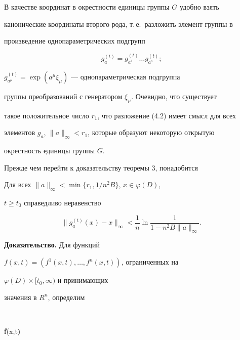 В качестве координат в окрестности единицы группы $G$ удобно взять 


канонические координаты второго рода, т.\,е.~разложить элемент группы в 


произведение однопараметрических подгрупп 


\begin{equation} 


g^{(t)}_a=g^{(t)}_{a^1}\dotsc g^{(t)}_{a^s}; 


\end{equation} 


$g^{(t)}_{a^\mu}=\exp(a^\mu\xi_\mu)$ --- однопараметрическая подгруппа


группы преобразований с генератором $\xi_\mu$. Очевидно, что существует


такое положительное число $r_1$, что разложение (4.2) имеет смысл для всех


элементов $g_a$, $\|a\|_\infty<r_1$, которые образуют некоторую открытую


окрестность единицы группы $G$. 


 


Прежде чем перейти к доказательству теоремы 3, понадобится 


 


\begin{lemnonum} 


Для всех $\|a\|_\infty<\min\{r_1,1/n^2B\}$, $x\in\varphi(D)$, 


$t\ge t_0$ справедливо неравенство 


\begin{equation} 


\|g^{(t)}_a(x)-x\|_\infty<\frac{1}{n}\ln 


\frac{1}{1-n^2B\|a\|_\infty}. 


\end{equation} 


\end{lemnonum} 


 


{\bf Доказательство.} Для функций 


$f(x,t)=(f^1(x,t),\dotsc,f^n(x,t))$, ограниченных на 


$\varphi(D)\times[t_0,\infty)$ и принимающих 


значения в $R^n$, определим 


$$ 


\|f(x,t)\|\equiv 


